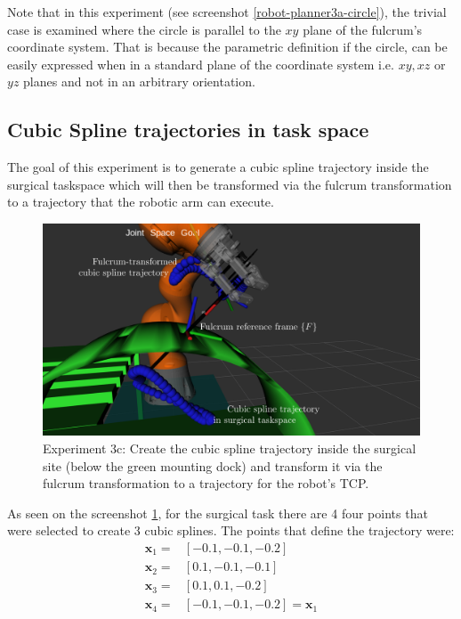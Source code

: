 Note that in this experiment (see screenshot \ref{robot-planner3a-circle}), the trivial case is examined where the circle is parallel to the $xy$ plane of the fulcrum's 
coordinate system. That is because the parametric definition if the circle, can be easily expressed when in a standard plane of the coordinate system i.e. $xy, xz$ 
or $yz$ planes and not in an arbitrary orientation.


\subsection{Cubic Spline trajectories in task space}

The goal of this experiment is to generate a cubic spline trajectory inside the surgical
taskspace which will then be transformed via the fulcrum transformation to a trajectory that the robotic arm can execute.

\begin{center}
\begin{figure}[!htb]
\centering
\includegraphics[width=\textwidth]{images/robot_planner3/3c_cubic_spline.png}
\caption{Experiment 3c: Create the cubic spline trajectory inside the surgical site (below the green mounting dock) and transform it via the fulcrum transformation to a trajectory for the robot's TCP.}
\label{robot-planner3c-cubic-spline}
\end{figure}
\end{center}

As seen on the screenshot \ref{robot-planner3c-cubic-spline}, for the surgical task there are 4 four points that were selected to create 3 cubic splines. The points that define the trajectory were:
\[
\begin{aligned}
\mathbf{x}_1 ={}& [-0.1, -0.1, -0.2] \\
\mathbf{x}_2 ={}& [0.1, -0.1, -0.1] \\
\mathbf{x}_3 ={}& [0.1, 0.1, -0.2] \\
\mathbf{x}_4 ={}& [-0.1, -0.1, -0.2] = \mathbf{x}_1
\end{aligned}
\]

